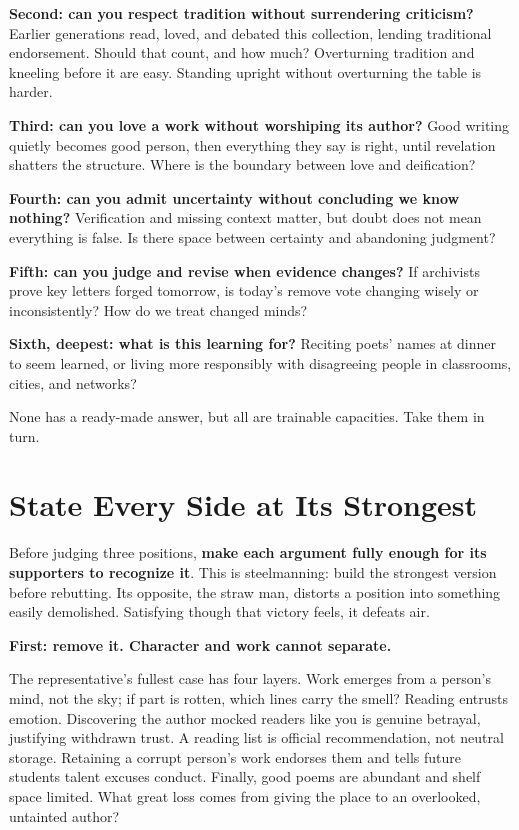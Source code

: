 \textbf{Second: can you respect tradition without surrendering criticism?} Earlier generations read, loved, and debated this collection, lending traditional endorsement. Should that count, and how much? Overturning tradition and kneeling before it are easy. Standing upright without overturning the table is harder.

\textbf{Third: can you love a work without worshiping its author?} Good writing quietly becomes good person, then everything they say is right, until revelation shatters the structure. Where is the boundary between love and deification?

\textbf{Fourth: can you admit uncertainty without concluding we know nothing?} Verification and missing context matter, but doubt does not mean everything is false. Is there space between certainty and abandoning judgment?

\textbf{Fifth: can you judge and revise when evidence changes?} If archivists prove key letters forged tomorrow, is today's remove vote changing wisely or inconsistently? How do we treat changed minds?

\textbf{Sixth, deepest: what is this learning for?} Reciting poets' names at dinner to seem learned, or living more responsibly with disagreeing people in classrooms, cities, and networks?

None has a ready-made answer, but all are trainable capacities. Take them in turn.

\section{State Every Side at Its Strongest}
Before judging three positions, \textbf{make each argument fully enough for its supporters to recognize it}. This is steelmanning: build the strongest version before rebutting. Its opposite, the straw man, distorts a position into something easily demolished. Satisfying though that victory feels, it defeats air.

\textbf{First: remove it. Character and work cannot separate.}

The representative's fullest case has four layers. Work emerges from a person's mind, not the sky; if part is rotten, which lines carry the smell? Reading entrusts emotion. Discovering the author mocked readers like you is genuine betrayal, justifying withdrawn trust. A reading list is official recommendation, not neutral storage. Retaining a corrupt person's work endorses them and tells future students talent excuses conduct. Finally, good poems are abundant and shelf space limited. What great loss comes from giving the place to an overlooked, untainted author?


